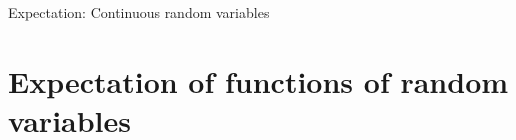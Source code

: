 \begin{frame}[allowframebreaks]{Expectation: Continuous random variables}


%   
%   

\end{frame}

\section{Expectation of functions of random variables}


